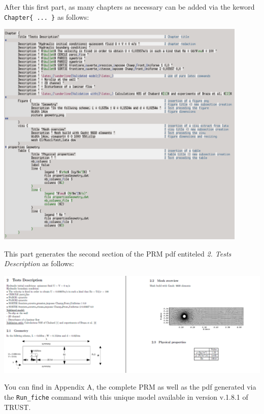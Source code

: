 After this first part, as many chapters as necessary can be added via the keword \verb"Chapter{ ... }" as follows:\newline
\begin{center}\includegraphics[width=12cm]{tools/chapter_PRM_1.png}\end{center}
\begin{center}\end{center}

This part generates the second section of the PRM pdf entiteled \textit{2. Tests Description} as follows:\newline
\begin{center}\includegraphics[width=15cm]{tools/chapter_PRM_1_pdf.png}\end{center}
\begin{center}\end{center}

You can find in Appendix A, the complete PRM as well as the pdf generated via the \verb "Run_fiche"  command with this unique model available in version v.1.8.1 of TRUST.\newline

